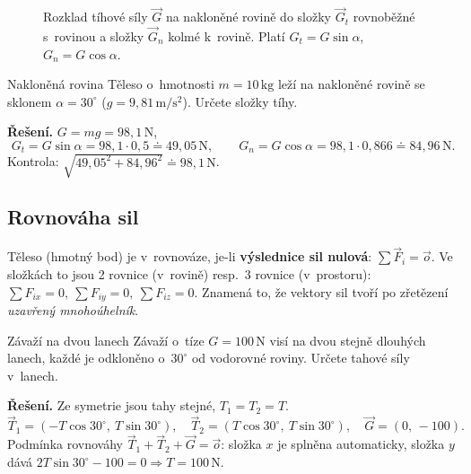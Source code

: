 \documentclass[a4paper,11pt]{article}
\newcommand{\jed}[1]{\,\mathrm{#1}}      %
\newcommand{\dc}{{,}}                    %
\begin{document}
\begin{figure}[!htbp]
\centering
{}
\caption{Rozklad tíhové síly $\vec G$ na nakloněné rovině do složky $\vec G_t$
rovnoběžné s~rovinou a složky $\vec G_n$ kolmé k~rovině. Platí
$G_t=G\sin\alpha$, $G_n=G\cos\alpha$.}
\end{figure}

\begin{priklad}{Nakloněná rovina}
Těleso o~hmotnosti $m=10\jed{kg}$ leží na nakloněné rovině se sklonem $\alpha=30^\circ$
($g=9\dc81\jed{m/s^2}$). Určete složky tíhy.

\medskip\noindent\textbf{Řešení.} $G=mg=98\dc1\jed{N}$,
\[
  G_t=G\sin\alpha=98\dc1\cdot0\dc5\doteq49\dc05\jed{N},\qquad
  G_n=G\cos\alpha=98\dc1\cdot0\dc866\doteq84\dc96\jed{N}.
\]
Kontrola: $\sqrt{49\dc05^2+84\dc96^2}\doteq98\dc1\jed{N}$. \checkmark
\end{priklad}

\subsection{Rovnováha sil}

Těleso (hmotný bod) je v~rovnováze, je-li \textbf{výslednice sil nulová}:
$\sum\vec F_i=\vec o$. Ve složkách to jsou 2 rovnice (v~rovině) resp.\ 3 rovnice
(v~prostoru): $\sum F_{ix}=0,\ \sum F_{iy}=0,\ \sum F_{iz}=0$. Znamená to, že vektory sil
tvoří po zřetězení \emph{uzavřený mnohoúhelník}.

\begin{priklad}{Závaží na dvou lanech}
Závaží o~tíze $G=100\jed{N}$ visí na dvou stejně dlouhých lanech, každé je odkloněno
o~$30^\circ$ od vodorovné roviny. Určete tahové síly v~lanech.

\medskip\noindent\textbf{Řešení.} Ze symetrie jsou tahy stejné, $T_1=T_2=T$.
\[
  \vec T_1=(-T\cos30^\circ,\ T\sin30^\circ),\quad
  \vec T_2=(T\cos30^\circ,\ T\sin30^\circ),\quad
  \vec G=(0,\,-100).
\]
Podmínka rovnováhy $\vec T_1+\vec T_2+\vec G=\vec o$: složka $x$ je splněna automaticky,
složka $y$ dává $2T\sin30^\circ-100=0\Rightarrow T=100\jed{N}$.
\end{priklad}
\end{document}
